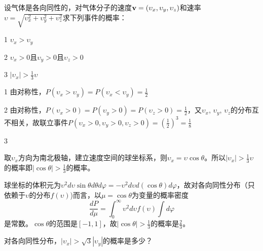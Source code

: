 \documentclass[CJK]{beamer}
\begin{document}
\begin{frame}
\bch
{\blue \small 设气体是各向同性的，对气体分子的速度${\mathbf{v}}=(\upsilon_x, \upsilon_y, \upsilon_z)$和速率$\upsilon = \sqrt{\upsilon_x^2+\upsilon_y^2+\upsilon_z^2}$求下列事件的概率：
\bitem
\item[1]{\blue $\upsilon_x>\upsilon_y$}
\item[2]{\blue $\upsilon_x>0$且$\upsilon_y>0$且$\upsilon_z>0$}
\item[3]{\blue $|\upsilon_x|>\frac{1}{3}\upsilon$}
\eitem
}

{\scriptsize

\bitem
\item[1]{由对称性，$P(\upsilon_x>\upsilon_y) = P(\upsilon_x<\upsilon_y)=\frac{1}{2}$}
\item[2]{由对称性，$P(\upsilon_x>0) = P(\upsilon_y>0) = P(\upsilon_z>0) = \frac{1}{2}$，又$\upsilon_x$, $\upsilon_y$, $\upsilon_z$的分布互不相关，故联立事件$P(\upsilon_x>0, \upsilon_y>0, \upsilon_z>0) =\left(\frac{1}{2}\right)^3=\frac{1}{8}$}
\item[3]{取$\upsilon_x$方向为南北极轴，建立速度空间的球坐标系，则$\upsilon_x = \upsilon \cos\theta$。所以$|\upsilon_x|>\frac{1}{3}\upsilon$的概率即$|\cos\theta| > \frac{1}{3}$的概率。


球坐标的体积元为$\upsilon^2d\upsilon\sin\theta d\theta d\varphi = -\upsilon^2d\upsilon d(\cos\theta) d\varphi$，故对各向同性分布（只依赖于$\upsilon$的分布$f(\upsilon)$)而言，以$\mu = \cos\theta$为变量的概率密度
$$\frac{dP}{d\mu} = \int_0^\infty \upsilon^2d\upsilon f(\upsilon) \int d\varphi $$ 
是常数。$\cos\theta$的范围是$[-1,1]$，故$|\cos\theta|>\frac{1}{3}$的概率是$\frac{2}{3}$。}
\eitem

}

\ech
\end{frame}


\begin{frame}
\bch
{}
对各向同性分布，$|\upsilon_x|>\sqrt{3}|\upsilon_y|$的概率是多少？
\ech
\end{frame}
\end{document}

